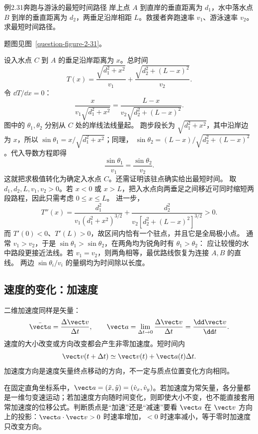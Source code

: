 \begin{origexamplebox}{例2.31\quad 奔跑与游泳的最短时间路径}
岸上点 $A$ 到直岸的垂直距离为 $d_1$，水中落水点 $B$ 到岸的垂直距离为 $d_2$，两垂足沿岸相距 $L$。救援者奔跑速率 $v_1$、游泳速率 $v_2$。求最短时间路径。
\par 题图见图~\ref{question-figure-2-31}。
\KQuestionBF
\end{origexamplebox}
\begin{xesolution}
设入水点 $C$ 到 $A$ 的垂足沿岸距离为 $x$。总时间
\RescueRouteDiagram
\[
T(x)=\frac{\sqrt{d_1^2+x^2}}{v_1}
+\frac{\sqrt{d_2^2+(L-x)^2}}{v_2}.
\]
令 $\dd T/\dd x=0$：
\[
\frac{x}{v_1\sqrt{d_1^2+x^2}}
=\frac{L-x}{v_2\sqrt{d_2^2+(L-x)^2}}.
\]
图中的 $\theta_1,\theta_2$ 分别从 $C$ 处的岸线法线量起。
跑步段长为 $\sqrt{d_1^2+x^2}$，其中沿岸边为 $x$，所以
$\sin\theta_1=x/\sqrt{d_1^2+x^2}$；同理，
$\sin\theta_2=(L-x)/\sqrt{d_2^2+(L-x)^2}$。代入导数方程即得
\[
  \boxed{\frac{\sin\theta_1}{v_1}=\frac{\sin\theta_2}{v_2}}.
\]
这就把求极值转化为确定入水点 $C$。还需证明该驻点确实给出最短时间。
取 $d_1,d_2,L,v_1,v_2>0$。若 $x<0$ 或 $x>L$，把入水点向两垂足之间移近可同时缩短两段路程，因此只需考虑 $0\le x\le L$。
进一步，
\[
 T''(x)=\frac{d_1^2}{v_1(d_1^2+x^2)^{3/2}}
       +\frac{d_2^2}{v_2[d_2^2+(L-x)^2]^{3/2}}>0.
\]
而 $T'(0)<0$、$T'(L)>0$，故区间内恰有一个驻点，并且它是全局极小点。
通常 $v_1>v_2$，于是 $\sin\theta_1>\sin\theta_2$，在两角均为锐角时有 $\theta_1>\theta_2$：
应让较慢的水中路段更接近法线。若 $v_1=v_2$，则两角相等，最优路线恢复为连接 $A,B$ 的直线。
两边 $\sin\theta_i/v_i$ 的量纲均为时间除以长度。
\end{xesolution}

\subsection{速度的变化：加速度}

二维加速度同样是矢量：
\begin{equation}
\bar{\vect a}=\frac{\Delta\vect v}{\Delta t},\qquad
\vect a=\lim_{\Delta t\to0}\frac{\Delta\vect v}{\Delta t}=\frac{\dd\vect v}{\dd t}.
\end{equation}
速度的大小改变或方向改变都会产生非零加速度。短时间内
\begin{equation}
\vect v(t+\Delta t)\simeq\vect v(t)+\vect a(t)\Delta t.
\end{equation}
加速度方向是速度矢量终点移动的方向，不一定与质点位置变化方向相同。

在固定直角坐标系中，$\vect a=(\ddot x,\ddot y)=(\dot v_x,\dot v_y)$。若加速度为常矢量，各分量都是一维匀变速运动；若加速度方向随时间变化，则即使大小不变，也不能直接套用常加速度的位移公式。判断质点是“加速”还是“减速”要看 $\vect a$ 在 $\vect v$ 方向上的投影：$\vect a\cdot\vect v>0$ 时速率增加，$<0$ 时速率减小，等于零时加速度只改变方向。

